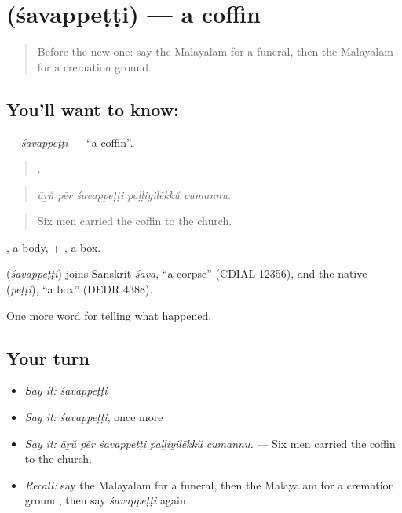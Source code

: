 \section[\texorpdfstring{\ml{ശവപ്പെട്ടി} (śavappeṭṭi)}{ശവപ്പെട്ടി (śavappeṭṭi)}]{ (śavappeṭṭi) — a coffin}

\label{lesson:ML-C391-savappetti}



\begin{quote}
Before the new one: say the Malayalam for a funeral, then the Malayalam for a cremation ground.
\end{quote}

\subsection*{You'll want to know: }
\textbf{} — \emph{śavappeṭṭi} — \textquotedblleft{}a coffin\textquotedblright{}.

\begin{quote}
    .
\end{quote}

\begin{quote}
\emph{āṟŭ pēr śavappeṭṭi paḷḷiyilēkkŭ cumannu.}
\end{quote}

\begin{quote}
Six men carried the coffin to the church.
\end{quote}

, a body, + , a box.

\begin{cousinweb}
\textbf{} (\emph{śavappeṭṭi}) joins Sanskrit \emph{śava}, \textquotedblleft{}a corpse\textquotedblright{} (CDIAL 12356), and the native  (\emph{peṭṭi}), \textquotedblleft{}a box\textquotedblright{} (DEDR 4388).
\end{cousinweb}

\begin{grammarlens}[title={What you've built}]
One more word for telling what happened.
\end{grammarlens}

\subsection*{Your turn}
\begin{itemize}
\raggedright
  \item \emph{Say it:} \emph{śavappeṭṭi}
  \item \emph{Say it:} \emph{śavappeṭṭi}, once more
  \item \emph{Say it:} \emph{āṟŭ pēr śavappeṭṭi paḷḷiyilēkkŭ cumannu.} — Six men carried the coffin to the church.
  \item \emph{Recall:} say the Malayalam for a funeral, then the Malayalam for a cremation ground, then say \emph{śavappeṭṭi} again
\end{itemize}

